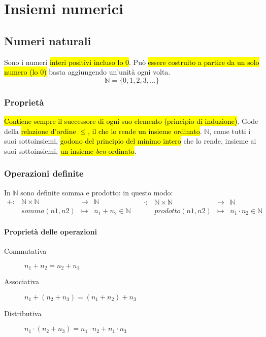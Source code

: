 \section{Insiemi numerici}
\subsection{Numeri naturali}
Sono i numeri \hl{interi positivi incluso lo 0}. Può \hl{essere costruito a 
partire da un solo numero (lo 0)} basta aggiungendo un'unità ogni volta.
\[ \mathbb{N} = \{0, 1, 2, 3, \dots \} \]

\subsubsection{Proprietà} 
\hl{Contiene sempre il successore di ogni suo elemento 
(principio di induzione)}. Gode della \hl{relazione d'ordine $\leq$, il che lo 
rende un insieme ordinato}. $\mathbb{N}$, come tutti i suoi sottoinsiemi, 
\hl{godono del principio del minimo intero} che lo rende, insieme ai suoi 
sottoinsiemi, \hl{un insieme \textit{ben} ordinato}.

\subsubsection{Operazioni definite} 
In $\mathbb{N}$ sono definite somma e prodotto: in questo modo:\[
    \begin{array}{cccc}
        +: &\mathbb{N} \times \mathbb{N} &\to &\mathbb{N} \\
        &somma(n1, n2) &\mapsto & n_1 + n_2 \in \mathbb{N}
    \end{array} \quad
    \begin{array}{cccc}
        \cdot: &\mathbb{N} \times \mathbb{N} &\to &\mathbb{N} \\
        &prodotto(n1, n2) &\mapsto & n_1 \cdot n_2 \in \mathbb{N}
    \end{array}
\]

\paragraph{Proprietà delle operazioni}
\begin{description}
    \item[Commutativa] $n_1 + n_2 = n_2 + n_1$
    \item[Associativa] $n_1 + (n_2 + n_3) = (n_1 + n_2) + n_3$
    \item[Distributiva] $n_1 \cdot (n_2 + n_3) = n_1 \cdot n_2 + n_1 \cdot n_3$
\end{description}

